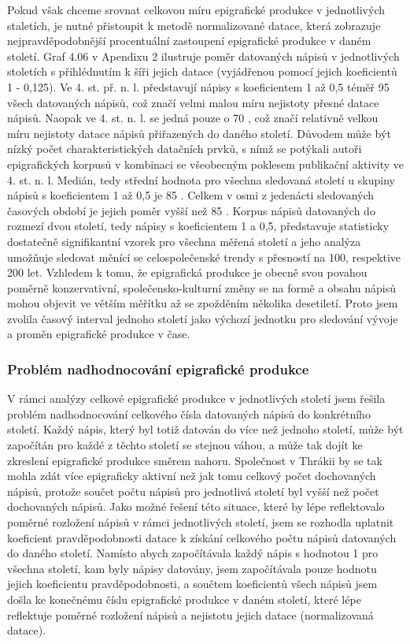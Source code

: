 Pokud však chceme srovnat celkovou míru epigrafické produkce v jednotlivých staletích, je nutné přistoupit k metodě normalizované datace, která zobrazuje nejpravděpodobnější procentuální zastoupení epigrafické produkce v daném století. Graf 4.06 v Apendixu 2 ilustruje poměr datovaných nápisů v jednotlivých stoletích s přihlédnutím k šíři jejich datace (vyjádřenou pomocí jejich koeficientů 1 - 0,125). Ve 4. st. př. n. l. představují nápisy s koeficientem 1 až 0,5 téměř 95  všech datovaných nápisů, což značí velmi malou míru nejistoty přesné datace nápisů. Naopak ve 4. st. n. l. se jedná pouze o 70 , což značí relativně velkou míru nejistoty datace nápisů přiřazených do daného století. Důvodem může být nízký počet charakteristických datačních prvků, s nímž se potýkali autoři epigrafických korpusů v kombinaci se všeobecným poklesem publikační aktivity ve 4. st. n. l. Medián, tedy střední hodnota pro všechna sledovaná století u skupiny nápisů s koeficientem 1 až 0,5 je 85 . Celkem v osmi z jedenácti sledovaných časových období je jejich poměr vyšší než 85 . Korpus nápisů datovaných do rozmezí dvou století, tedy nápisy s koeficientem 1 a 0,5, představuje statisticky dostatečně signifikantní vzorek pro všechna měřená století a jeho analýza umožňuje sledovat měnící se celospolečenské trendy s přesností na 100, respektive 200 let. Vzhledem k tomu, že epigrafická produkce je obecně svou povahou poměrně konzervativní, společensko-kulturní změny se na formě a obsahu nápisů mohou objevit ve větším měřítku až se zpožděním několika desetiletí. Proto jsem zvolila časový interval jednoho století jako výchozí jednotku pro sledování vývoje a proměn epigrafické produkce v čase.

\subsubsection[problém-nadhodnocování-epigrafické-produkce]{Problém nadhodnocování epigrafické produkce}

V rámci analýzy celkové epigrafické produkce v jednotlivých století jsem řešila problém nadhodnocování celkového čísla datovaných nápisů do konkrétního století. Každý nápis, který byl totiž datován do více než jednoho století, může být započítán pro každé z těchto století se stejnou váhou, a může tak dojít ke zkreslení epigrafické produkce směrem nahoru. Společnost v Thrákii by se tak mohla zdát více epigraficky aktivní než jak tomu celkový počet dochovaných nápisů, protože součet počtu nápisů pro jednotlivá století byl vyšší než počet dochovaných nápisů. Jako možné řešení této situace, které by lépe reflektovalo poměrné rozložení nápisů v rámci jednotlivých století, jsem se rozhodla uplatnit koeficient pravděpodobnosti datace k získání celkového počtu nápisů datovaných do daného století. Namísto abych započítávala každý nápis s hodnotou 1 pro všechna století, kam byly nápisy datovány, jsem započítávala pouze hodnotu jejich koeficientu pravděpodobnosti, a součtem koeficientů všech nápisů jsem došla ke konečnému číslu epigrafické produkce v daném století, které lépe reflektuje poměrné rozložení nápisů a nejistotu jejich datace (normalizovaná datace).

